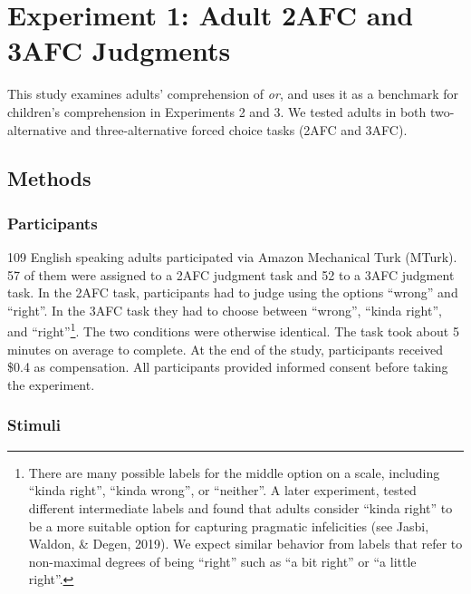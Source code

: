 \documentclass[
  english,
  ,man,floatsintext]{apa6}
\begin{document}
\hypertarget{study1}{%
\section{Experiment 1: Adult 2AFC and 3AFC Judgments}\label{study1}}

This study examines adults' comprehension of \emph{or}, and uses it as a benchmark for children's comprehension in Experiments 2 and 3. We tested adults in both two-alternative and three-alternative forced choice tasks (2AFC and 3AFC).

\hypertarget{methods}{%
\subsection{Methods}\label{methods}}

\hypertarget{participants}{%
\subsubsection{Participants}\label{participants}}

109 English speaking adults participated via Amazon Mechanical Turk (MTurk). 57 of them were assigned to a 2AFC judgment task and 52 to a 3AFC judgment task. In the 2AFC task, participants had to judge using the options \enquote{wrong} and \enquote{right}. In the 3AFC task they had to choose between \enquote{wrong}, \enquote{kinda right}, and \enquote{right}\footnote{There are many possible labels for the middle option on a scale, including \enquote{kinda right}, \enquote{kinda wrong}, or \enquote{neither}. A later experiment, tested different intermediate labels and found that adults consider \enquote{kinda right} to be a more suitable option for capturing pragmatic infelicities (see Jasbi, Waldon, \& Degen, 2019). We expect similar behavior from labels that refer to non-maximal degrees of being \enquote{right} such as \enquote{a bit right} or \enquote{a little right}.}. The two conditions were otherwise identical. The task took about 5 minutes on average to complete. At the end of the study, participants received \$0.4 as compensation. All participants provided informed consent before taking the experiment.

\hypertarget{stimuli}{%
\subsubsection{Stimuli}\label{stimuli}}
\end{document}
